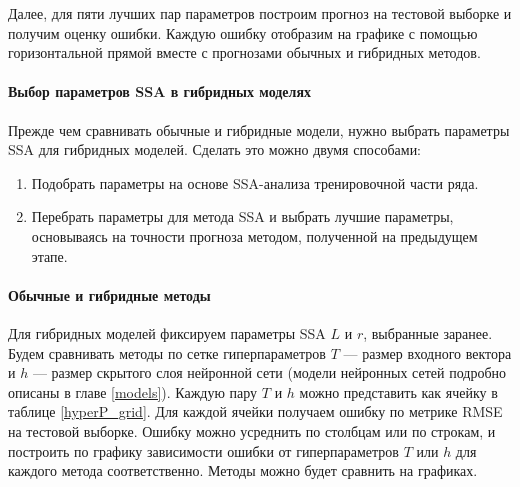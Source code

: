 \documentclass[specialist,
               substylefile = spbu.rtx,
               subf,href,colorlinks=true, 12p]{disser}
\begin{document}
Далее, для пяти лучших пар параметров построим прогноз на тестовой выборке и получим оценку ошибки. Каждую ошибку отобразим на графике с помощью горизонтальной прямой вместе с прогнозами обычных и гибридных методов.

\paragraph{Выбор параметров SSA в гибридных моделях} Прежде чем сравнивать обычные и гибридные модели, нужно выбрать параметры SSA для гибридных моделей. Сделать это можно двумя способами:

\begin{enumerate}
	\item Подобрать параметры на основе SSA-анализа тренировочной части ряда.
	\item Перебрать параметры для метода SSA и выбрать лучшие параметры, основываясь на точности прогноза методом, полученной на предыдущем этапе.
\end{enumerate}

\paragraph{Обычные и гибридные методы} Для гибридных моделей фиксируем параметры SSA $L$ и $r$, выбранные заранее. Будем сравнивать методы по сетке гиперпараметров $T$ --- размер входного вектора и $h$ --- размер скрытого слоя нейронной сети (модели нейронных сетей подробно описаны в главе \ref{models}). Каждую пару $T$ и $h$ можно представить как ячейку в таблице \ref{hyperP_grid}. Для каждой ячейки получаем ошибку по метрике RMSE на тестовой выборке. Ошибку можно усреднить по столбцам или по строкам, и построить по графику зависимости ошибки от гиперпараметров $T$ или $h$ для каждого метода соответственно. Методы можно будет сравнить на графиках.
\end{document}

